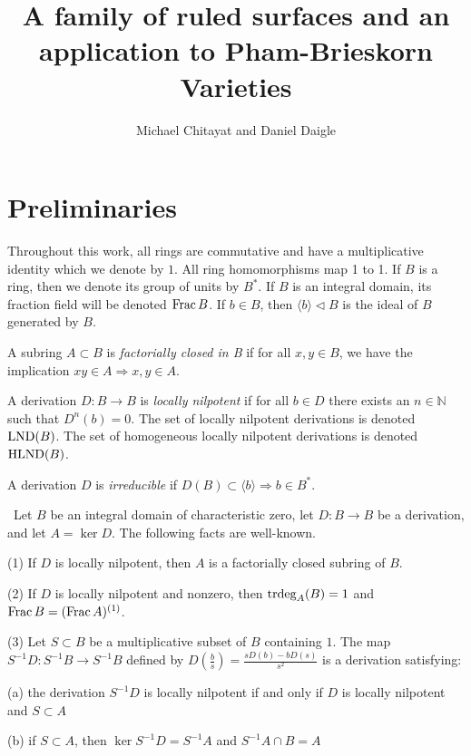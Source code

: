 \documentclass[12pt]{amsart}
\theoremstyle{plain}
\theoremstyle{definition}
\newcommand{\trdeg}{	\operatorname{{\rm trdeg}}}
\newcommand{\Frac}{		\operatorname{{\rm Frac}}}
\newcommand{\lb}{\langle}
\newcommand{\rb}{\rangle}
\newcommand{\Nat}{\ensuremath{\mathbb{N}}}
\newcommand{\lnd}{\operatorname{{\rm LND}}}
\newcommand{\hlnd}{\operatorname{{\rm HLND}}}
\begin{document}
\renewcommand{\baselinestretch}{1.07}




\title{A family of ruled surfaces and an application to Pham-Brieskorn Varieties}


\author{Michael Chitayat and Daniel Daigle}

\maketitle
  
\vfuzz=2pt


\section{Preliminaries}

Throughout this work, all rings are commutative and have a multiplicative identity which we denote by $1$. All ring homomorphisms map 1 to 1. If $B$ is a ring, then we denote its group of units by $B^*$. If $B$ is an integral domain, its fraction field will be denoted $\Frac B$. If $b \in B$, then $\lb b \rb \lhd B$ is the ideal of $B$ generated by $B$.  

A subring $A \subset B$ is \textit{factorially closed in B} if for all $x,y \in B$, we have the implication $xy \in A \Rightarrow x,y \in A$. 

A derivation $D : B \to B$ is \textit{locally nilpotent} if for all $b \in D$ there exists an $n \in \Nat$ such that $D^n(b) = 0$.  The set of locally nilpotent derivations is denoted $\lnd(B)$. The set of homogeneous locally nilpotent derivations is denoted $\hlnd(B)$.  

A derivation $D$ is \textit{irreducible} if $D(B) \subset \lb b \rb \Rightarrow b \in B^*$.    

\begin{subsection}\  	
	Let $B$ be an integral domain of characteristic zero, let $D : B \to B$ be a derivation, and let $A = \ker D$. The following facts are well-known. 
	
	(1) If $D$ is locally nilpotent, then $A$ is a factorially closed subring of $B$. 
	
	(2) If $D$ is locally nilpotent and nonzero, then $\trdeg_A(B) = 1$ and $\Frac B  = (\Frac A)^{(1)}$. 
	
	(3) Let $S \subset B$ be a multiplicative subset of $B$ containing $1$. The map $S^{-1}D : S^{-1} B \to S^{-1} B$ defined by $D(\frac{b}{s}) = \frac{sD(b)-bD(s)}{s^2}$ is a derivation satisfying:
	
	\quad (a) the derivation $S^{-1}D$ is locally nilpotent if and only if $D$ is locally nilpotent and $S \subset A$
	
	\quad (b) if $S \subset A$, then $\ker S^{-1}D = S^{-1}A$ and $S^{-1}A \cap B = A$
\end{subsection}
\end{document}
